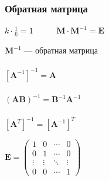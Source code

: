 \documentclass[10pt]{beamer}
\begin{document}
	\begin{frame}\frametitle{Обратная матрица}
		
		\begin{center}
			
			$k\cdot\displaystyle\frac{1}{k}=1$ \ \ \ \ \   $\mathbf M\cdot \mathbf M^{-1}=\mathbf E$
			
		\end{center}
		
		{
			$\mathbf M^{-1}$ --- обратная матрица \\ ~ \\
			
			$\left[ \mathbf A^{-1}\right]^{-1} = \mathbf A$ \\ ~ \\
			
			$ \left( \mathbf{AB} \right) ^{-1}=\mathbf B^{-1}\mathbf A^{-1}$ \\~\\
			
			$ \left[\mathbf A^T\right]^{-1}  = \left[\mathbf A^{-1}\right]^{T} $
			
			
			
		}
		{
			$\mathbf E = \begin{pmatrix} 1 & 0 & \cdots & 0 \\ 0 & 1 & \cdots & 0 \\ \vdots & \vdots & \ddots & \vdots \\ 0 & 0 & \cdots & 1 \end{pmatrix}$
			
			
		}	
		
		
	\end{frame}
	
\end{document}
